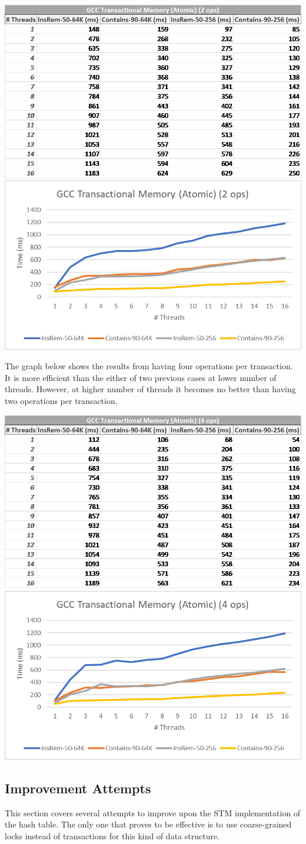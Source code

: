 \documentclass[11pt]{article} %
\begin{document}
\bigskip
\includegraphics[width=0.5\linewidth]{Table2.png}
\includegraphics[width=0.5\linewidth]{Graph2.png}

The graph below shows the results from having four operations per transaction. It is more efficient than the either of two previous cases at lower number of threads. However, at higher number of threads it becomes no better than having two operations per transaction.

\bigskip
\includegraphics[width=0.5\linewidth]{Table3.png}
\includegraphics[width=0.5\linewidth]{Graph3.png}

\subsection{Improvement Attempts}

This section covers several attempts to improve upon the STM implementation of the hash table. The only one that proves to be effective is to use coarse-grained locks instead of transactions for this kind of data structure.
\end{document}
